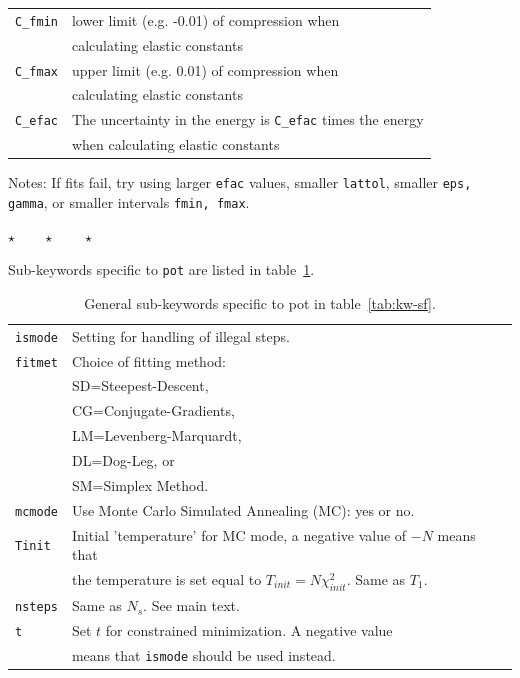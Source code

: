 \documentclass[a4paper,12pt,onecolumn]{article}
\newcommand{\stars}{\begin{center} \vspace{0.5cm}$\star \qquad \star \qquad \star$\vspace{0.5cm}\end{center}}
\begin{document}
\begin{table}[!h]
\begin{center}
\begin{tabular}{|l|l|}
\verb+C_fmin+      & lower limit (e.g. -0.01) of compression when \\
                     & calculating elastic constants \\
\verb+C_fmax+      & upper limit (e.g.  0.01) of compression when \\
                     & calculating elastic constants \\
\verb+C_efac+      & The uncertainty in the energy is \verb+C_efac+ times the energy \\
                     & when calculating elastic constants \\
\hline
\hline
\end{tabular}
\end{center}
\end{table}


Notes: If fits fail, try using larger \verb+efac+ values, smaller \verb+lattol+,
smaller \verb+eps, gamma+, or smaller intervals \verb+fmin, fmax+.

\stars

Sub-keywords specific to \verb+pot+ are listed in table~\ref{tab:kw-sf-par-pot}.



\begin{table}[!h]
\caption{
General sub-keywords specific to \textrm{pot} in table~\ref{tab:kw-sf}.
\label{tab:kw-sf-par-pot}
}
\begin{center}
\begin{tabular}{|l|l|}
\hline
\hline
\verb+ismode+       & Setting for handling of illegal steps. \\
\verb+fitmet+      & Choice of fitting method: \\
                     & SD=Steepest-Descent, \\
                     & CG=Conjugate-Gradients, \\
                     & LM=Levenberg-Marquardt, \\
                     & DL=Dog-Leg, or \\
                     & SM=Simplex Method. \\
\verb+mcmode+      & Use Monte Carlo Simulated Annealing (MC): yes or no. \\
\verb+Tinit+       & Initial 'temperature' for MC mode, a negative value of $-N$ means that \\
                   & the temperature is set equal to $T_{init} = N \chi^2_{init}$. Same as $T_1$. \\
\verb+nsteps+      & Same as $N_s$. See main text. \\
\verb+t+            & Set $t$ for constrained minimization. A negative value \\
                    & means that \verb+ismode+ should be used instead. \\
\hline
\hline
\end{tabular}
\end{center}
\end{table}
\end{document}

